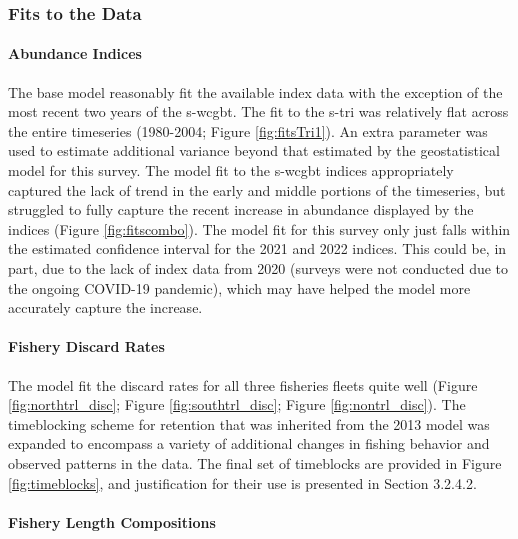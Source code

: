 \documentclass[11pt,
  english,
  letterpaper,
]{article}
\begin{document}
\hypertarget{fits-to-the-data}{%
\subsubsection{Fits to the Data}\label{fits-to-the-data}}

\hypertarget{abundance-indices}{%
\paragraph{Abundance Indices}\label{abundance-indices}}

The base model reasonably fit the available index data with the exception of the most recent two years of the \gls{s-wcgbt}. The fit to the \gls{s-tri} was relatively flat across the entire timeseries (1980-2004; Figure \ref{fig:fitsTri1}). An extra parameter was used to estimate additional variance beyond that estimated by the geostatistical model for this survey. The model fit to the \gls{s-wcgbt} indices appropriately captured the lack of trend in the early and middle portions of the timeseries, but struggled to fully capture the recent increase in abundance displayed by the indices (Figure \ref{fig:fitscombo}). The model fit for this survey only just falls within the estimated confidence interval for the 2021 and 2022 indices. This could be, in part, due to the lack of index data from 2020 (surveys were not conducted due to the ongoing COVID-19 pandemic), which may have helped the model more accurately capture the increase.

\hypertarget{fishery-discard-rates}{%
\paragraph{Fishery Discard Rates}\label{fishery-discard-rates}}

The model fit the discard rates for all three fisheries fleets quite well (Figure \ref{fig:northtrl_disc}; Figure \ref{fig:southtrl_disc}; Figure \ref{fig:nontrl_disc}). The timeblocking scheme for retention that was inherited from the 2013 model was expanded to encompass a variety of additional changes in fishing behavior and observed patterns in the data. The final set of timeblocks are provided in Figure \ref{fig:timeblocks}, and justification for their use is presented in Section 3.2.4.2.

\hypertarget{fishery-length-compositions-1}{%
\paragraph{Fishery Length Compositions}\label{fishery-length-compositions-1}}
\end{document}
